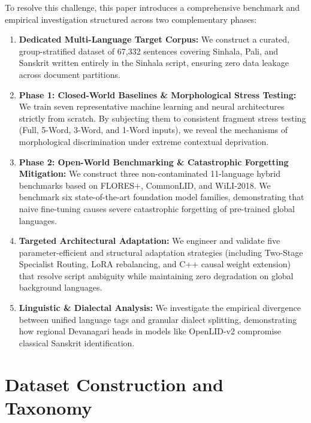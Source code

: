 \documentclass[11pt]{article}
\begin{document}
To resolve this challenge, this paper introduces a comprehensive benchmark and empirical investigation structured across two complementary phases:
\begin{enumerate}
    \item \textbf{Dedicated Multi-Language Target Corpus:} We construct a curated, group-stratified dataset of 67,332 sentences covering Sinhala, Pali, and Sanskrit written entirely in the Sinhala script, ensuring zero data leakage across document partitions.
    \item \textbf{Phase 1: Closed-World Baselines \& Morphological Stress Testing:} We train seven representative machine learning and neural architectures strictly from scratch. By subjecting them to consistent fragment stress testing (Full, 5-Word, 3-Word, and 1-Word inputs), we reveal the mechanisms of morphological discrimination under extreme contextual deprivation.
    \item \textbf{Phase 2: Open-World Benchmarking \& Catastrophic Forgetting Mitigation:} We construct three non-contaminated 11-language hybrid benchmarks based on FLORES+, CommonLID, and WiLI-2018. We benchmark six state-of-the-art foundation model families, demonstrating that naive fine-tuning causes severe catastrophic forgetting of pre-trained global languages.
    \item \textbf{Targeted Architectural Adaptation:} We engineer and validate five parameter-efficient and structural adaptation strategies (including Two-Stage Specialist Routing, LoRA rebalancing, and C++ causal weight extension) that resolve script ambiguity while maintaining zero degradation on global background languages.
    \item \textbf{Linguistic \& Dialectal Analysis:} We investigate the empirical divergence between unified language tags and granular dialect splitting, demonstrating how regional Devanagari heads in models like OpenLID-v2 compromise classical Sanskrit identification.
\end{enumerate}

\section{Dataset Construction and Taxonomy}
\end{document}
